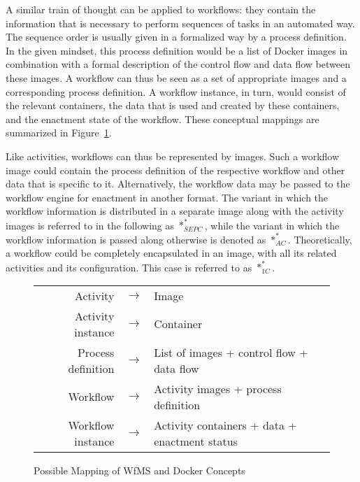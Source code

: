     A similar train of thought can be applied to workflows: they contain the information that is necessary to perform sequences of tasks in an automated way. The sequence order is usually given in a formalized way by a process definition. In the given mindset, this process definition would be a list of Docker images in combination with a formal description of the control flow and data flow between these images. A workflow can thus be seen as a set of appropriate images and a corresponding process definition.
    A workflow instance, in turn, would consist of the relevant containers, the data that is used and created by these containers, and the enactment state of the workflow. These conceptual mappings are summarized in Figure~\ref{fig:conceptual_correspondence_between_wfms_and_docker_entities}.

    Like activities, workflows can thus be represented by images. Such a workflow image could contain the process definition of the respective workflow and other data that is specific to it. Alternatively, the workflow data may be passed to the workflow engine for enactment in another format.
    The variant in which the workflow information is distributed in a separate image along with the activity images is referred to in the following as $*_{SEPC}^{*}$, while the variant in which the workflow information is passed along otherwise is denoted as $*_{AC}^{*}$.
    Theoretically, a workflow could be completely encapsulated in an image, \ie with all its related activities and its configuration. This case is referred to as $*_{1C}^*$.

    \begin{figure}[htbp]
      \centering
        \begin{tabular}{r c l}
          \toprule
          Activity           & $\rightarrow$ & Image\\
          Activity instance  & $\rightarrow$ & Container\\
          Process definition & $\rightarrow$ & List of images + control flow + data flow\\
          Workflow           & $\rightarrow$ & Activity images + process definition\\
          Workflow instance  & $\rightarrow$ & Activity containers + data + enactment status\\
          \bottomrule
        \end{tabular}
      \caption{Possible Mapping of WfMS and Docker Concepts}
      \label{fig:conceptual_correspondence_between_wfms_and_docker_entities}
    \end{figure}

